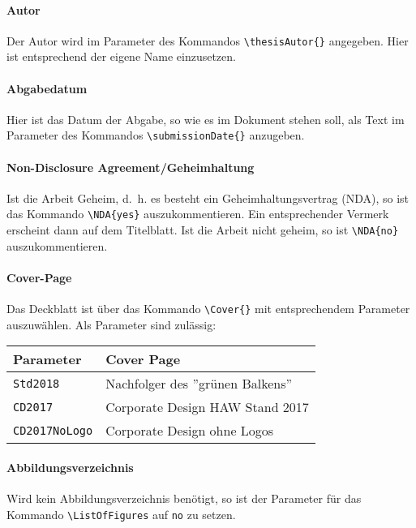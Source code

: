 \paragraph{Autor} Der Autor wird im Parameter des Kommandos \texttt{\textbackslash thesisAutor\{\}} angegeben. Hier ist entsprechend der eigene Name einzusetzen.

\paragraph{Abgabedatum} Hier ist das Datum der Abgabe, so wie es im Dokument stehen soll, als Text im Parameter des Kommandos \texttt{\textbackslash submissionDate\{\}} anzugeben.

\paragraph{Non-Disclosure Agreement/Geheimhaltung} Ist die Arbeit Geheim, d.~h. es besteht ein Geheimhaltungsvertrag (NDA), so ist das Kommando \texttt{\textbackslash NDA\{yes\}} auszukommentieren. Ein entsprechender Vermerk erscheint dann auf dem Titelblatt. Ist die Arbeit nicht geheim, so ist \texttt{\textbackslash NDA\{no\}} auszukommentieren.

\paragraph{Cover-Page} Das Deckblatt ist über das Kommando
\texttt{\textbackslash Cover\{\}} mit entsprechendem Parameter
auszuwählen. Als Parameter sind zulässig:

\begin{center}
  \begin {tabular}{ll}
    Parameter & Cover Page \\
    \hline
    \texttt{Std2018} & Nachfolger des ''grünen Balkens'' \\
    \texttt{CD2017} & Corporate Design HAW Stand 2017 \\
    \texttt{CD2017NoLogo} & Corporate Design ohne Logos \\
  \end{tabular}
\end{center}

\paragraph{Abbildungsverzeichnis} Wird kein Abbildungsverzeichnis benötigt, so ist der Parameter für das Kommando \texttt{\textbackslash ListOfFigures} auf \texttt{no} zu setzen.

